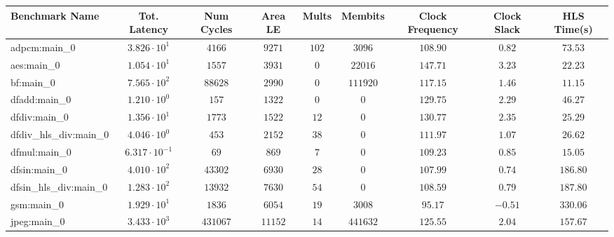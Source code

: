 \begin{tabular}{|l|c|c|c|c|c|c|c|c|}
\hline
Benchmark Name          & Tot. Latency            & Num Cycles & Area LE   & Mults   & Membits    & Clock Frequency & Clock Slack & HLS Time(s) \\
\hline
adpcm:main\_0           & $ 3.826 \cdot 10^{1}  $ & $ 4166   $ & $ 9271  $ & $ 102 $ & $ 3096   $ & $ 108.90      $ & $ 0.82    $ & $ 73.53   $ \\
aes:main\_0             & $ 1.054 \cdot 10^{1}  $ & $ 1557   $ & $ 3931  $ & $ 0   $ & $ 22016  $ & $ 147.71      $ & $ 3.23    $ & $ 22.23   $ \\
bf:main\_0              & $ 7.565 \cdot 10^{2}  $ & $ 88628  $ & $ 2990  $ & $ 0   $ & $ 111920 $ & $ 117.15      $ & $ 1.46    $ & $ 11.15   $ \\
dfadd:main\_0           & $ 1.210 \cdot 10^{0}  $ & $ 157    $ & $ 1322  $ & $ 0   $ & $ 0      $ & $ 129.75      $ & $ 2.29    $ & $ 46.27   $ \\
dfdiv:main\_0           & $ 1.356 \cdot 10^{1}  $ & $ 1773   $ & $ 1522  $ & $ 12  $ & $ 0      $ & $ 130.77      $ & $ 2.35    $ & $ 25.29   $ \\
dfdiv\_hls\_div:main\_0 & $ 4.046 \cdot 10^{0}  $ & $ 453    $ & $ 2152  $ & $ 38  $ & $ 0      $ & $ 111.97      $ & $ 1.07    $ & $ 26.62   $ \\
dfmul:main\_0           & $ 6.317 \cdot 10^{-1} $ & $ 69     $ & $ 869   $ & $ 7   $ & $ 0      $ & $ 109.23      $ & $ 0.85    $ & $ 15.05   $ \\
dfsin:main\_0           & $ 4.010 \cdot 10^{2}  $ & $ 43302  $ & $ 6930  $ & $ 28  $ & $ 0      $ & $ 107.99      $ & $ 0.74    $ & $ 186.80  $ \\
dfsin\_hls\_div:main\_0 & $ 1.283 \cdot 10^{2}  $ & $ 13932  $ & $ 7630  $ & $ 54  $ & $ 0      $ & $ 108.59      $ & $ 0.79    $ & $ 187.80  $ \\
gsm:main\_0             & $ 1.929 \cdot 10^{1}  $ & $ 1836   $ & $ 6054  $ & $ 19  $ & $ 3008   $ & $ 95.17       $ & $ -0.51   $ & $ 330.06  $ \\
jpeg:main\_0            & $ 3.433 \cdot 10^{3}  $ & $ 431067 $ & $ 11152 $ & $ 14  $ & $ 441632 $ & $ 125.55      $ & $ 2.04    $ & $ 157.67  $ \\

\end{tabular}
